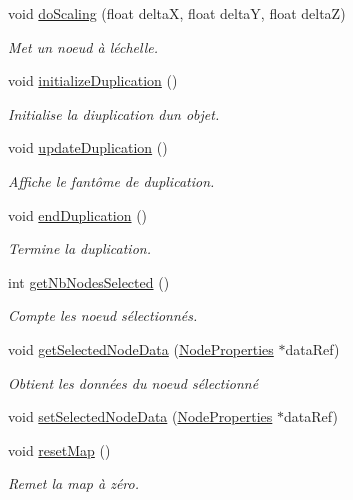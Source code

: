\begin{DoxyCompactItemize}
void \hyperlink{group__inf2990_gac8decb6e4a3eabfa6baa89022aaab8eb}{do\+Scaling} (float delta\+X, float delta\+Y, float delta\+Z)
\begin{DoxyCompactList}\small\item\em Met un noeud à l\textquotesingle{}échelle. \end{DoxyCompactList}\item 
void \hyperlink{group__inf2990_ga6f50ec221ffc9a37a80fc87b9241000e}{initialize\+Duplication} ()
\begin{DoxyCompactList}\small\item\em Initialise la diuplication d\textquotesingle{}un objet. \end{DoxyCompactList}\item 
void \hyperlink{group__inf2990_ga1a3e0ca25ffb4442968ce0977ca37d45}{update\+Duplication} ()
\begin{DoxyCompactList}\small\item\em Affiche le fantôme de duplication. \end{DoxyCompactList}\item 
void \hyperlink{group__inf2990_ga236c0dba051c913078932ea1cf4a2e76}{end\+Duplication} ()
\begin{DoxyCompactList}\small\item\em Termine la duplication. \end{DoxyCompactList}\item 
int \hyperlink{group__inf2990_gac85e226dae7761e7e98e0df151c5a766}{get\+Nb\+Nodes\+Selected} ()
\begin{DoxyCompactList}\small\item\em Compte les noeud sélectionnés. \end{DoxyCompactList}\item 
void \hyperlink{group__inf2990_ga7dfe6c0df984dd4d2c5402d9fab0fc75}{get\+Selected\+Node\+Data} (\hyperlink{struct_node_properties}{Node\+Properties} $\ast$data\+Ref)
\begin{DoxyCompactList}\small\item\em Obtient les données du noeud sélectionné \end{DoxyCompactList}\item 
void \hyperlink{group__inf2990_gae40b907a6c30f55176cde6b1736eaf72}{set\+Selected\+Node\+Data} (\hyperlink{struct_node_properties}{Node\+Properties} $\ast$data\+Ref)
\item 
void \hyperlink{group__inf2990_gace5ff9435d6bcf501298d401207733bf}{reset\+Map} ()
\begin{DoxyCompactList}\small\item\em Remet la map à zéro. \end{DoxyCompactList}\item 

\end{DoxyCompactItemize}
